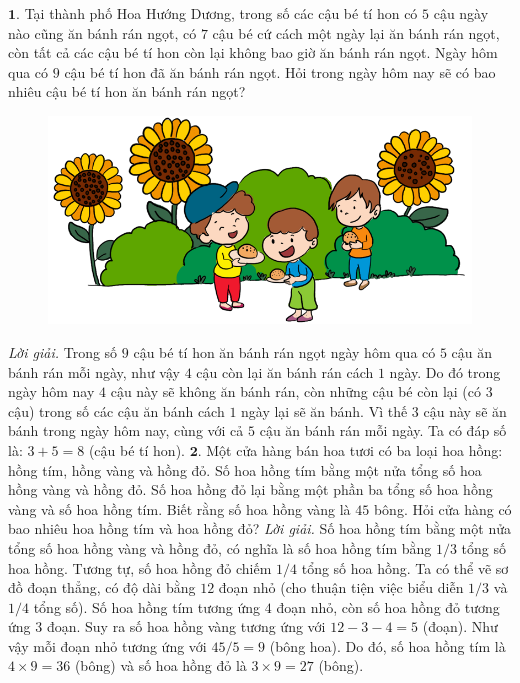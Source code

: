 \begin{multicols}{2}
	$\pmb{1.}$ 	Tại thành phố Hoa Hướng Dương, trong số các cậu bé tí hon có $5$ cậu ngày nào cũng ăn bánh rán ngọt, có $7$ cậu bé cứ cách một ngày lại ăn bánh rán ngọt, còn tất cả các cậu bé tí hon còn lại không bao giờ ăn bánh rán ngọt. Ngày hôm qua có $9$ cậu bé tí hon đã ăn bánh rán ngọt. Hỏi trong ngày hôm nay sẽ có bao nhiêu cậu bé tí hon ăn bánh rán ngọt?
	\begin{figure}[H]
		\centering
		\vspace*{-10pt}
		\captionsetup{labelformat= empty, justification=centering}
		\includegraphics[width=0.9\linewidth]{Pi9_bai1}
		\vspace*{-15pt}
	\end{figure}
	\textit{Lời giải.} 	Trong số $9$ cậu bé tí hon ăn bánh rán ngọt ngày hôm qua có $5$ cậu ăn bánh rán mỗi ngày, như vậy $4$ cậu còn lại ăn bánh rán cách $1$ ngày. Do đó trong ngày hôm nay $4$ cậu này sẽ không ăn bánh rán, còn những cậu bé còn lại (có $3$ cậu) trong số các cậu ăn bánh cách $1$ ngày lại sẽ ăn bánh. Vì thế $3$ cậu này sẽ ăn bánh trong ngày hôm nay, cùng với cả $5$ cậu ăn bánh rán mỗi ngày. Ta có đáp số là: $3+5 = 8$ (cậu bé tí hon).
	\vskip 0.1cm
	$\pmb{2.}$ Một cửa hàng bán hoa tươi có ba loại hoa hồng: hồng tím, hồng vàng và hồng đỏ. Số hoa hồng tím bằng một nửa tổng số hoa hồng vàng và hồng đỏ. Số hoa hồng đỏ lại bằng một phần ba tổng số hoa hồng vàng và số hoa hồng tím. Biết rằng số hoa hồng vàng là $45$ bông. Hỏi cửa hàng có bao nhiêu hoa hồng tím và hoa hồng đỏ?
	\vskip 0.1cm
	\textit{Lời giải.} 	Số hoa hồng tím bằng một nửa tổng số hoa hồng vàng và hồng đỏ, có nghĩa là số hoa hồng tím bằng $1/3$ tổng số hoa hồng. Tương tự, số hoa hồng đỏ chiếm $1/4$ tổng số hoa hồng. Ta có thể vẽ sơ đồ đoạn thẳng, có độ dài bằng $12$ đoạn nhỏ (cho thuận tiện việc biểu diễn $1/3$ và $1/4$ tổng số). Số hoa hồng tím tương ứng $4$ đoạn nhỏ, còn số hoa hồng đỏ tương ứng $3$ đoạn. Suy ra số hoa hồng vàng tương ứng với $12 - 3 - 4 = 5$ (đoạn). Như vậy mỗi đoạn nhỏ tương ứng với $45/5 = 9$ (bông hoa). Do đó, số hoa hồng tím là $4\times 9=36$ (bông) và số hoa hồng đỏ là $3\times 9=27$ (bông).

\end{multicols}
